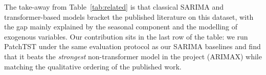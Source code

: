 The take-away from Table~\ref{tab:related} is that classical SARIMA
and transformer-based models bracket the published literature on this
dataset, with the gap mainly explained by the seasonal component and
the modelling of exogenous variables. Our contribution sits in the
last row of the table: we run PatchTST under the same evaluation
protocol as our SARIMA baselines and find that it beats the
\emph{strongest} non-transformer model in the project (ARIMAX) while
matching the qualitative ordering of the published work.
